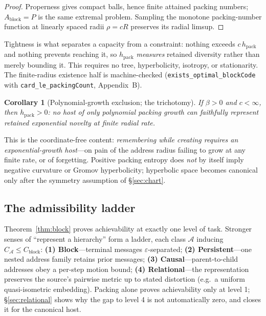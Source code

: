 \documentclass[11pt,reqno]{amsart}
\theoremstyle{plain}
\newtheorem{corollary}[theorem]{Corollary}
\theoremstyle{definition}
\newcommand{\hpack}{h_{\mathrm{pack}}}
\newcommand{\Cblock}{C_{\mathrm{block}}}
\newcommand{\eps}{\varepsilon}
\begin{document}
\begin{proof}
Properness gives compact balls, hence finite attained packing numbers; $A_{\mathrm{block}}=P$ is the same extremal problem. Sampling the monotone packing-number function at linearly spaced radii $\rho=cR$ preserves its radial limsup.
\end{proof}

Tightness is what separates a capacity from a constraint: nothing exceeds $c\,\hpack$ and nothing prevents reaching it, so $\hpack$ \emph{measures} retained diversity rather than merely bounding it. This requires no tree, hyperbolicity, isotropy, or stationarity. The finite-radius existence half is machine-checked (\texttt{exists\_optimal\_blockCode} with \texttt{card\_le\_packingCount}, Appendix~B).

\begin{corollary}[Polynomial-growth exclusion; the trichotomy]\label{cor:poly}
If $\beta>0$ and $c<\infty$, then $\hpack>0$: no host of only polynomial packing growth can faithfully represent retained exponential novelty at finite radial rate.
\end{corollary}

This is the coordinate-free content: \emph{remembering while creating requires an exponential-growth host}---on pain of the address radius failing to grow at any finite rate, or of forgetting. Positive packing entropy does \emph{not} by itself imply negative curvature or Gromov hyperbolicity; hyperbolic space becomes canonical only after the symmetry assumption of \S\ref{sec:chart}.

\subsection{The admissibility ladder}\label{sec:ladder}

Theorem~\ref{thm:block} proves achievability at exactly one level of task. Stronger senses of ``represent a hierarchy'' form a ladder, each class $\mathcal A$ inducing $C_{\mathcal A}\le\Cblock$: \textbf{(1) Block}---terminal messages $\eps$-separated; \textbf{(2) Persistent}---one nested address family retains prior messages; \textbf{(3) Causal}---parent-to-child addresses obey a per-step motion bound; \textbf{(4) Relational}---the representation preserves the source's pairwise metric up to stated distortion (e.g.\ a uniform quasi-isometric embedding). Packing alone proves achievability only at level 1; \S\ref{sec:relational} shows why the gap to level 4 is not automatically zero, and closes it for the canonical host.
\end{document}
